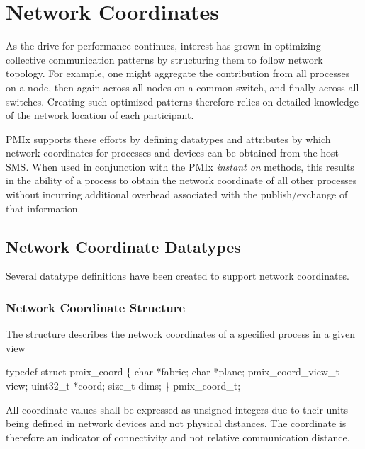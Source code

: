 \chapter{Network Coordinates}
\label{chap:network_coords}

As the drive for performance continues, interest has grown in optimizing collective communication patterns by structuring them to follow network topology. For example, one might aggregate the contribution from all processes on a node, then again across all nodes on a common switch, and finally across all switches. Creating such optimized patterns therefore relies on detailed knowledge of the network location of each participant.

\ac{PMIx} supports these efforts by defining datatypes and attributes by which network coordinates for processes and devices can be obtained from the host \ac{SMS}. When used in conjunction with the \ac{PMIx} \emph{instant on} methods, this results in the ability of a process to obtain the network coordinate of all other processes without incurring additional overhead associated with the publish/exchange of that information.

\section{Network Coordinate Datatypes}

Several datatype definitions have been created to support network coordinates.

\subsection{Network Coordinate Structure}

The  structure describes the network coordinates of a specified process in a given view

\cspecificstart
\begin{codepar}
typedef struct pmix_coord \{
    char *fabric;
    char *plane;
    pmix_coord_view_t view;
    uint32_t *coord;
    size_t dims;
\} pmix_coord_t;
\end{codepar}
\cspecificend

All coordinate values shall be expressed as unsigned integers due to their units being defined in network devices and not physical distances. The coordinate is therefore an indicator of connectivity and not relative communication distance.


